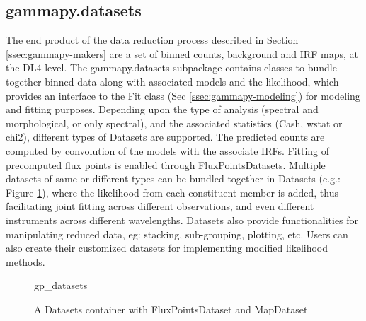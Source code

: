 \subsection{gammapy.datasets}
\label{ssec:gammapy-datasets}

The end product of the data reduction process described in Section \ref{ssec:gammapy-makers} are a set of binned counts, background and IRF maps, at the DL4 level. The gammapy.datasets subpackage contains classes to bundle together binned data along with associated models and the likelihood, which provides an interface to the Fit class (Sec \ref{ssec:gammapy-modeling}) for modeling and fitting purposes. Depending upon the type of analysis (spectral and morphological, or only spectral), and the associated statistics (Cash, wstat or chi2), different types of Datasets are supported. The predicted counts are computed by convolution of the models with the associate IRFs. Fitting of precomputed flux points is enabled through FluxPointsDatasets. Multiple datasets of same or different types can be  bundled together in Datasets (e.g.: Figure \ref{fig*:minted:gp_datasets}), where the likelihood from each constituent member is added, thus facilitating joint fitting across different observations, and even different instruments across different wavelengths. Datasets also provide functionalities for manipulating reduced data, eg: stacking, sub-grouping, plotting, etc. Users can also create their customized datasets for implementing modified likelihood methods. 

\begin{figure}
	{gp_datasets}
	\caption{A Datasets container with FluxPointsDataset and MapDataset}
	\label{fig*:minted:gp_datasets}
\end{figure}

